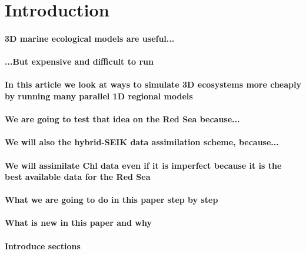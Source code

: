 \section{Introduction}

\paragraph{3D marine ecological models are useful...}

\paragraph{...But expensive and difficult to run}

\paragraph{In this article we look at ways to simulate 3D ecosystems more
cheaply by running many parallel 1D regional models}

\paragraph{We are going to test that idea on the Red Sea because...}

\paragraph{We will also the hybrid-SEIK data assimilation scheme, because...}

\paragraph{We will assimilate Chl data even if it is imperfect because it is
the best available data for the Red Sea}

\paragraph{What we are going to do in this paper step by step}

\paragraph{What is new in this paper and why}

\paragraph{Introduce sections}


